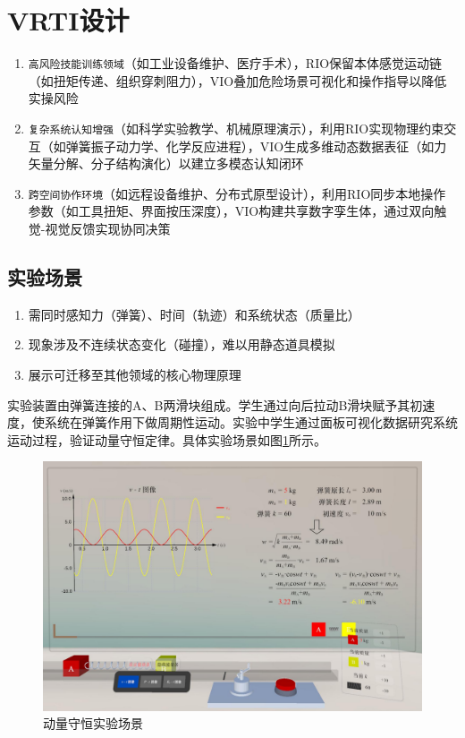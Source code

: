 \documentclass[runningheads]{llncs}
\begin{document}
\section{VRTI设计}
\begin{enumerate}
  \item \texttt{高风险技能训练领域}（如工业设备维护、医疗手术），RIO保留本体感觉运动链（如扭矩传递、组织穿刺阻力），VIO叠加危险场景可视化和操作指导以降低实操风险
  \item \texttt{复杂系统认知增强}（如科学实验教学、机械原理演示），利用RIO实现物理约束交互（如弹簧振子动力学、化学反应进程），VIO生成多维动态数据表征（如力矢量分解、分子结构演化）以建立多模态认知闭环
  \item \texttt{跨空间协作环境}（如远程设备维护、分布式原型设计），利用RIO同步本地操作参数（如工具扭矩、界面按压深度），VIO构建共享数字孪生体，通过双向触觉-视觉反馈实现协同决策
\end{enumerate}

\subsection{实验场景}
\begin{enumerate}
    \item 需同时感知力（弹簧）、时间（轨迹）和系统状态（质量比）
    \item 现象涉及不连续状态变化（碰撞），难以用静态道具模拟
    \item 展示可迁移至其他领域的核心物理原理
\end{enumerate}

实验装置由弹簧连接的A、B两滑块组成。学生通过向后拉动B滑块赋予其初速度，使系统在弹簧作用下做周期性运动。实验中学生通过面板可视化数据研究系统运动过程，验证动量守恒定律。具体实验场景如图\ref{fig:experiment-scenario}所示。

\begin{figure}
  \centering
  \includegraphics[width=\linewidth]{image/experiment-scenario.pdf}
  \caption{动量守恒实验场景}
  \label{fig:experiment-scenario}
\end{figure}
\end{document}
